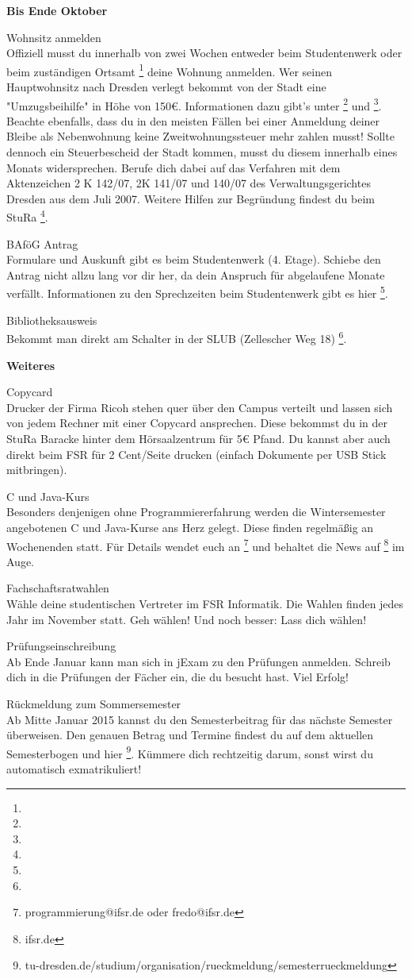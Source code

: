 \textbf{Bis Ende Oktober}

Wohnsitz anmelden \\
Offiziell musst du innerhalb von zwei Wochen entweder beim Studentenwerk oder beim zuständigen Ortsamt \footnote{} deine Wohnung anmelden. Wer seinen Hauptwohnsitz nach Dresden verlegt bekommt von der Stadt eine "Umzugsbeihilfe" in Höhe von 150€. Informationen dazu gibt's unter \footnote{} und \footnote{}. Beachte ebenfalls, dass du in den meisten Fällen bei einer Anmeldung deiner Bleibe als Nebenwohnung keine Zweitwohnungssteuer mehr zahlen musst! Sollte dennoch ein Steuerbescheid der Stadt kommen, musst du diesem innerhalb eines Monats widersprechen. Berufe dich dabei auf das Verfahren mit dem Aktenzeichen 2 K 142/07, 2K 141/07 und 140/07 des Verwaltungsgerichtes Dresden aus dem Juli 2007. Weitere Hilfen zur Begründung findest du beim StuRa \footnote{}.

BAföG Antrag \\
Formulare und Auskunft gibt es beim Studentenwerk (4. Etage). Schiebe den Antrag nicht allzu lang vor dir her, da dein Anspruch für abgelaufene Monate verfällt. Informationen zu den Sprechzeiten beim Studentenwerk gibt es hier \footnote{}.

Bibliotheksausweis \\
Bekommt man direkt am Schalter in der SLUB (Zellescher Weg 18) \footnote{}.

\textbf{Weiteres}

Copycard \\
Drucker der Firma Ricoh stehen quer über den Campus verteilt und lassen sich von jedem Rechner mit einer Copycard ansprechen. Diese bekommst du in der StuRa Baracke hinter dem Hörsaalzentrum für 5€ Pfand. Du kannst aber auch direkt beim FSR für 2 Cent/Seite drucken (einfach Dokumente per USB Stick mitbringen).

C und Java-Kurs \\
Besonders denjenigen ohne Programmiererfahrung werden die Wintersemester angebotenen C und Java-Kurse ans Herz gelegt. Diese finden regelmäßig an Wochenenden statt. Für Details wendet euch an \footnote{programmierung@ifsr.de oder fredo@ifsr.de} und behaltet die News auf \footnote{ifsr.de} im Auge.

Fachschaftsratwahlen \\
Wähle deine studentischen Vertreter im FSR Informatik. Die Wahlen finden jedes Jahr im November statt. Geh wählen! Und noch besser: Lass dich wählen!

Prüfungseinschreibung \\
Ab Ende Januar kann man sich in jExam zu den Prüfungen anmelden. Schreib dich in die Prüfungen der Fächer ein, die du besucht hast. Viel Erfolg!

Rückmeldung zum Sommersemester \\
Ab Mitte Januar 2015 kannst du den Semesterbeitrag für das nächste Semester überweisen. Den genauen Betrag und Termine findest du auf dem aktuellen Semesterbogen und hier \footnote{tu-dresden.de/studium/organisation/rueckmeldung/semesterrueckmeldung}. Kümmere dich rechtzeitig darum, sonst wirst du automatisch exmatrikuliert!